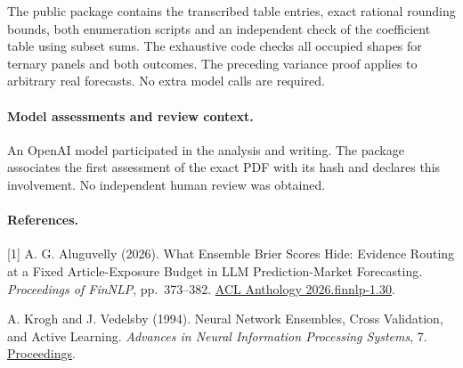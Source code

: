 \documentclass[11pt]{article}
\begin{document}
The public package contains the transcribed table entries, exact rational rounding bounds, both enumeration scripts and an independent check of the coefficient table using subset sums. The exhaustive code checks all occupied shapes for ternary panels and both outcomes. The preceding variance proof applies to arbitrary real forecasts. No extra model calls are required.

\paragraph{Model assessments and review context.}
An OpenAI model participated in the analysis and writing. The package associates the first assessment of the exact PDF with its hash and declares this involvement. No independent human review was obtained.

\paragraph{References.}
[1] A. G. Aluguvelly (2026). What Ensemble Brier Scores Hide: Evidence Routing at a Fixed Article-Exposure Budget in LLM Prediction-Market Forecasting. \emph{Proceedings of FinNLP}, pp.\ 373--382. \href{https://aclanthology.org/2026.finnlp-1.30/}{ACL Anthology 2026.finnlp-1.30}.

\smallskip\noindent
[2] A. Krogh and J. Vedelsby (1994). Neural Network Ensembles, Cross Validation, and Active Learning. \emph{Advances in Neural Information Processing Systems}, 7. \href{https://papers.nips.cc/paper_files/paper/1994/hash/b8c37e33defde51cf91e1e03e51657da-Abstract.html}{Proceedings}.
\end{document}
